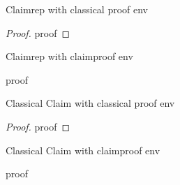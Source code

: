 \documentclass{lipics-v2021}
\begin{document}
\begin{claimrep}Claimrep with classical proof env
\end{claimrep}
\begin{proof}
proof
\end{proof}

\begin{claimrep}Claimrep with claimproof env
\end{claimrep}
\begin{claimproof}
proof
\end{claimproof}

\begin{claim}Classical Claim with classical proof env
\end{claim}
\begin{proof}
proof
\end{proof}

\begin{claim}Classical Claim with claimproof env
\end{claim}
\begin{claimproof}
proof
\end{claimproof}
\end{document}
